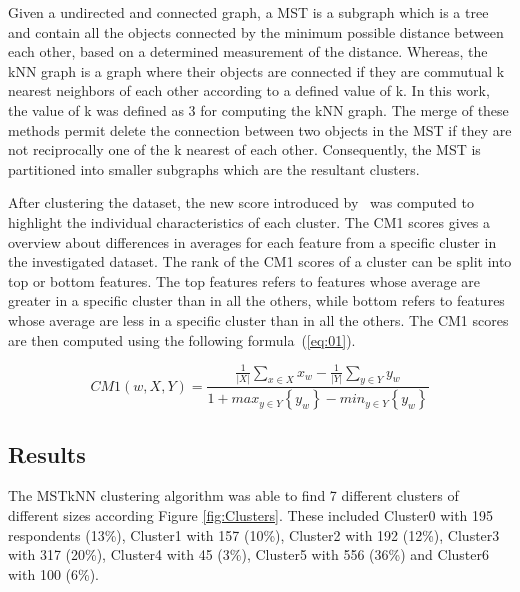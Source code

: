 \documentclass{article}
\begin{document}
Given a undirected and connected graph, a MST is a subgraph which is a tree and
contain all the objects connected by the minimum possible distance between each
other, based on a determined measurement of the distance. Whereas, the kNN graph
is a graph where their objects are connected if they are commutual k nearest
neighbors of each other according to a defined value of k. In this work, the
value of k was defined as 3 for computing the kNN graph. The merge of these
methods permit delete the connection between two objects in the MST if they are
not reciprocally one of the k nearest of each other. Consequently, the MST is
partitioned into smaller subgraphs which are the resultant clusters.


After clustering the dataset, the new score introduced by~\cite{Marsden2013}
was computed to highlight the individual characteristics of each cluster. The
CM1 scores gives a overview about differences in averages for each feature from
a specific cluster in the investigated dataset. The rank of the CM1 scores of a
cluster can be split into top or bottom features. The top features refers to
features whose average are greater in a specific cluster than in all the others,
while bottom refers to features whose average are less in a specific cluster
than in all the others. The CM1 scores are then computed using the following
formula~(\ref{eq:01}).

\begin{equation}
CM1(w,X,Y) = \frac{\frac{1}{\left|X\right|}  \sum_{x \in X} x_{w} - \frac{1}{\left|Y\right|}  \sum_{y \in Y} y_{w}} {1 + max_{y \in Y } \left\{ y_{w} \right\}- min_{y \in Y} \left\{y_{w}\right\} } \label{eq:01}
\end{equation}



\subsection{Results}

The MSTkNN clustering algorithm was able to find 7 different clusters of
different sizes according Figure \ref{fig:Clusters}. These included Cluster0
with 195 respondents (13\%), Cluster1 with 157 (10\%), Cluster2 with 192 (12\%),
Cluster3 with 317 (20\%), Cluster4 with 45 (3\%), Cluster5 with 556 (36\%) and
Cluster6 with 100 (6\%).
\end{document}
